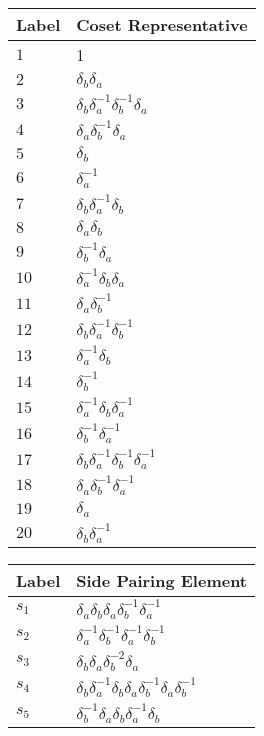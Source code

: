 \documentclass{article}
\begin{document}

\begin{center}
\begin{tabular}{ll}
\toprule
Label & Coset Representative\\
\midrule
$1$ & 1 \\
$2$ & $\delta_b^{}\delta_a^{}$ \\
$3$ & $\delta_b^{}\delta_a^{-1}\delta_b^{-1}\delta_a^{}$ \\
$4$ & $\delta_a^{}\delta_b^{-1}\delta_a^{}$ \\
$5$ & $\delta_b^{}$ \\
$6$ & $\delta_a^{-1}$ \\
$7$ & $\delta_b^{}\delta_a^{-1}\delta_b^{}$ \\
$8$ & $\delta_a^{}\delta_b^{}$ \\
$9$ & $\delta_b^{-1}\delta_a^{}$ \\
$10$ & $\delta_a^{-1}\delta_b^{}\delta_a^{}$ \\
$11$ & $\delta_a^{}\delta_b^{-1}$ \\
$12$ & $\delta_b^{}\delta_a^{-1}\delta_b^{-1}$ \\
$13$ & $\delta_a^{-1}\delta_b^{}$ \\
$14$ & $\delta_b^{-1}$ \\
$15$ & $\delta_a^{-1}\delta_b^{}\delta_a^{-1}$ \\
$16$ & $\delta_b^{-1}\delta_a^{-1}$ \\
$17$ & $\delta_b^{}\delta_a^{-1}\delta_b^{-1}\delta_a^{-1}$ \\
$18$ & $\delta_a^{}\delta_b^{-1}\delta_a^{-1}$ \\
$19$ & $\delta_a^{}$ \\
$20$ & $\delta_b^{}\delta_a^{-1}$ \\
\bottomrule
\end{tabular}
\hfill
\begin{tabular}{ll}
\toprule
Label & Side Pairing Element\\
\midrule
$s_{1}$ & $\delta_a^{}\delta_b^{}\delta_a^{}\delta_b^{-1}\delta_a^{-1}$ \\
$s_{2}$ & $\delta_a^{-1}\delta_b^{-1}\delta_a^{-1}\delta_b^{-1}$ \\
$s_{3}$ & $\delta_b^{}\delta_a^{}\delta_b^{-2}\delta_a^{}$ \\
$s_{4}$ & $\delta_b^{}\delta_a^{-1}\delta_b^{}\delta_a^{}\delta_b^{-1}\delta_a^\
{}\delta_b^{-1}$ \\
$s_{5}$ & $\delta_b^{-1}\delta_a^{}\delta_b^{}\delta_a^{-1}\delta_b^{}$ \\

\end{tabular}
\end{center}
\end{document}
